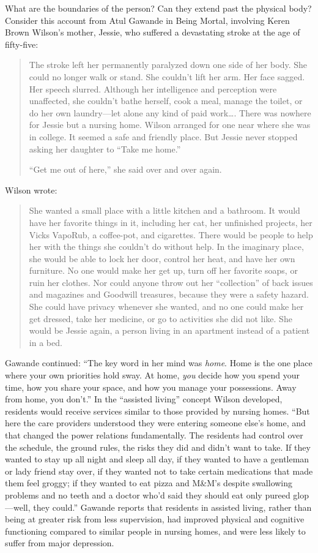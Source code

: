 What are the boundaries of the person?  Can they extend past the physical body? 
Consider this account from Atul Gawande in Being Mortal, involving Keren Brown
Wilson's mother, Jessie, who suffered a devastating stroke at the age of
fifty-five:
\begin{quotation}
The stroke left her permanently paralyzed down one side of her body. She could
no longer walk or stand. She couldn't lift her arm. Her face sagged. Her speech
slurred. Although her intelligence and perception were unaffected, she couldn't
bathe herself, cook a meal, manage the toilet, or do her own laundry---let
alone any kind of paid work{\dots}. There was nowhere for Jessie but a nursing
home.  Wilson arranged for one near where she was in college. It seemed a safe
and friendly place. But Jessie never stopped asking her daughter to ``Take me
home.''

``Get me out of here,'' she said over and over again.
\end{quotation}
Wilson wrote:
\begin{quote}
She wanted a small place with a little kitchen and a bathroom. It would have her
favorite things in it, including her cat, her unfinished projects, her Vicks
VapoRub, a coffee-pot, and cigarettes. There would be people to help her with
the things she couldn't do without help. In the imaginary place, she would be
able to lock her door, control her heat, and have her own furniture. No one
would make her get up, turn off her favorite soaps, or ruin her clothes. Nor
could anyone throw out her ``collection'' of back issues and magazines and
Goodwill treasures, because they were a safety hazard. She could have privacy
whenever she wanted, and no one could make her get dressed, take her medicine,
or go to activities she did not like. She would be Jessie again, a person
living in an apartment instead of a patient in a bed.
\end{quote}
Gawande continued: ``The key word in her mind was \textit{home}. Home is the one
place where your own priorities hold sway. At home, \textit{you} decide how you
spend your time, how you share your space, and how you manage your possessions.
Away from home, you don't.''  In the ``assisted living'' concept Wilson
developed, residents would receive services similar to those provided by
nursing homes. ``But here the care providers understood they were entering
someone else's home, and that changed the power relations fundamentally. The
residents had control over the schedule, the ground rules, the risks they did
and didn't want to take.  If they wanted to stay up all night and sleep all
day, if they wanted to have a gentleman or lady friend stay over, if they
wanted not to take certain medications that made them feel groggy; if they
wanted to eat pizza and M\&M's despite swallowing problems and no teeth and a
doctor who'd said they should eat only pureed glop---well, they could.'' 
Gawande reports that residents in assisted living, rather than being at greater
risk from less supervision, had improved physical and cognitive functioning
compared to similar people in nursing homes, and were less likely to suffer
from major depression.

